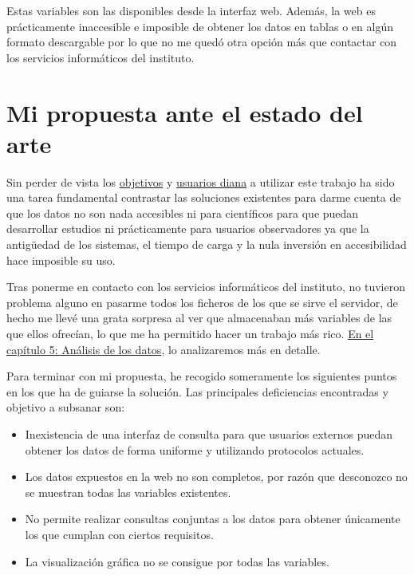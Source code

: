 Estas variables son las disponibles desde la interfaz web. Además, la web es prácticamente
inaccesible e imposible de obtener los datos en tablas o en algún formato descargable por
lo que no me quedó otra opción más que contactar con los servicios informáticos del
instituto.


\section{Mi propuesta ante el estado del arte}

Sin perder de vista los \hyperref[sec:obj]{objetivos} y \hyperref[sec:usu]{usuarios diana}
a utilizar este trabajo ha sido una tarea fundamental contrastar las soluciones
existentes para darme cuenta de que los datos no son nada accesibles ni para científicos
para que puedan desarrollar estudios ni prácticamente para usuarios observadores ya que la
antigüedad de los sistemas, el tiempo de carga y la nula inversión en accesibilidad hace
imposible su uso.

Tras ponerme en contacto con los servicios informáticos del instituto, no tuvieron
problema alguno en pasarme todos los ficheros de los que se sirve el servidor, de hecho me
llevé una grata sorpresa al ver que almacenaban más variables de las que ellos ofrecían,
lo que me ha permitido hacer un trabajo más rico. \hyperref[cap:5]{En el capítulo 5:
Análisis de los datos}, lo analizaremos más en detalle.


Para terminar con mi propuesta, he recogido someramente los siguientes puntos en los que
ha de guiarse la solución. Las principales deficiencias encontradas y objetivo a subsanar
son:
\begin{itemize}
    \item Inexistencia de una interfaz de consulta para que usuarios externos puedan
    obtener los datos de forma uniforme y utilizando protocolos actuales.
    \item Los datos expuestos en la web no son completos, por razón que desconozco no se
    muestran todas las variables existentes.
    \item No permite realizar consultas conjuntas a los datos para obtener únicamente
    los que cumplan con ciertos requisitos.
    \item La visualización gráfica no se consigue por todas las variables.
\end{itemize}
